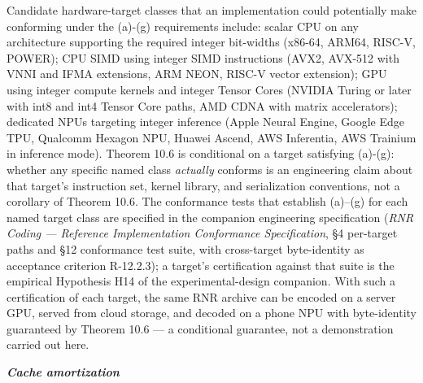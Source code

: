 \documentclass[
]{article}
\begin{document}
Candidate hardware-target classes that an implementation could
potentially make conforming under the (a)-(g) requirements include:
scalar CPU on any architecture supporting the required integer
bit-widths (x86-64, ARM64, RISC-V, POWER); CPU SIMD using integer
SIMD instructions (AVX2, AVX-512 with VNNI and IFMA extensions, ARM
NEON, RISC-V vector extension); GPU using integer compute kernels
and integer Tensor Cores (NVIDIA Turing or later with int8 and int4
Tensor Core paths, AMD CDNA with matrix accelerators); dedicated
NPUs targeting integer inference (Apple Neural Engine, Google Edge
TPU, Qualcomm Hexagon NPU, Huawei Ascend, AWS Inferentia, AWS
Trainium in inference mode). Theorem 10.6 is conditional on a
target satisfying (a)-(g): whether any specific named class
\emph{actually} conforms is an engineering claim about that
target's instruction set, kernel library, and serialization
conventions, not a corollary of Theorem 10.6. The conformance tests
that establish (a)--(g) for each named target class are specified in
the companion engineering specification (\emph{RNR Coding --- Reference
Implementation Conformance Specification}, §4 per-target paths and §12
conformance test suite, with cross-target byte-identity as acceptance
criterion R-12.2.3); a target's certification against that suite is the
empirical Hypothesis H14 of the experimental-design companion. With
such a certification of each target, the same RNR archive can be
encoded on a server GPU, served from cloud storage, and decoded on a
phone NPU with byte-identity guaranteed by Theorem 10.6 --- a
conditional guarantee, not a demonstration carried out here.

\emph{\textbf{Cache amortization}}
\end{document}
